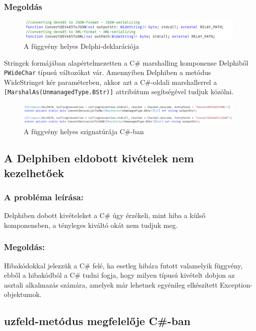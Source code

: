 \documentclass[tocnopagenum]{thesis-ekf}
\theoremstyle{definition}
\theoremstyle{remark}
\begin{document}
	\subsubsection{Megoldás}
	\begin{figure}[h!]
		\centering
		\includegraphics[scale=0.75]{string_delphi}
		\caption{A függvény helyes Delphi-deklarációja}
		\label{string_delphi}
	\end{figure}
	Stringek formájában alapértelmezetten a C\# marshalling komponense Delphiből \verb*|PWideChar| típusú változókat vár. Amennyiben Delphiben a metódus WideStringet kér paraméterben, akkor azt a C\#-oldali marshallerrel a \verb*|[MarshalAs(UnmanagedType.BStr)]| attribútum segítségével tudjuk közölni.
	\begin{figure}[h!]
		\centering
		\includegraphics[scale=0.64]{string_csharp}
		\caption{A függvény helyes szignatúrája C\#-ban}
		\label{string_csharp}
	\end{figure}
	
	\cite{sof_strhandling}
	\subsection{A Delphiben eldobott kivételek nem kezelhetőek}
	\subsubsection{A probléma leírása:} Delphiben dobott kivételeket a C\# úgy érzékeli, mint hiba a külső komponensben, a tényleges kiváltó okát nem tudjuk meg.
	\subsubsection{Megoldás:} Hibakódokkal jelezzük a C\# felé, ha esetleg hibára futott valamelyik függvény, ebből a hibakódból a C\# tudni fogja, hogy milyen típusú kivételt dobjon az asztali alkalmazás számára, amelyek már lehetnek egyénileg elkészített Exception-objektumok.
	\subsection{uzfeld-metódus megfelelője C\#-ban}
\end{document}
